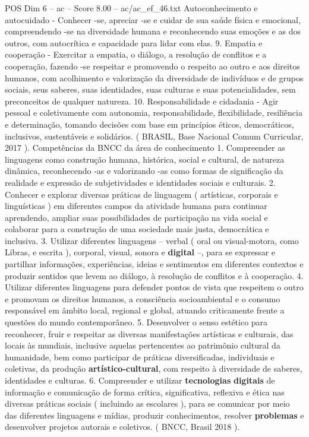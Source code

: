 \begin{textsample}{POS Dim 6 – ac – Score 8.00 – ac/ac\_ef\_46.txt}
Autoconhecimento e autocuidado - Conhecer -se, apreciar -se e cuidar de sua saúde física e emocional, compreendendo -se na diversidade humana e reconhecendo suas emoções e as dos outros, com autocrítica e capacidade para lidar com elas. 9.
Empatia e cooperação - Exercitar a empatia, o diálogo, a resolução de conflitos e a cooperação, fazendo -se respeitar e promovendo o respeito ao outro e aos direitos humanos, com acolhimento e valorização da diversidade de indivíduos e de grupos sociais, seus saberes, suas identidades, suas culturas e suas potencialidades, sem preconceitos de qualquer natureza. 10.
Responsabilidade e cidadania - Agir pessoal e coletivamente com autonomia, responsabilidade, flexibilidade, resiliência e determinação, tomando decisões com base em princípios éticos, democráticos, inclusivos, sustentáveis e solidários. ( BRASIL, Base Nacional Comum Curricular, 2017 ).
Competências da BNCC da área de conhecimento 1.
Compreender as linguagens como construção humana, histórica, social e cultural, de natureza dinâmica, reconhecendo -as e valorizando -as como formas de significação da realidade e expressão de subjetividades e identidades sociais e culturais. 2.
Conhecer e explorar diversas práticas de linguagem ( artísticas, corporais e linguísticas ) em diferentes campos da atividade humana para continuar aprendendo, ampliar suas possibilidades de participação na vida social e colaborar para a construção de uma sociedade mais justa, democrática e inclusiva. 3.
Utilizar diferentes linguagens – verbal ( oral ou visual-motora, como Libras, e escrita ), corporal, visual, sonora e \textbf{digital} –, para se expressar e partilhar informações, experiências, ideias e sentimentos em diferentes contextos e produzir sentidos que levem ao diálogo, à resolução de conflitos e à cooperação. 4.
Utilizar diferentes linguagens para defender pontos de vista que respeitem o outro e promovam os direitos humanos, a consciência socioambiental e o consumo responsável em âmbito local, regional e global, atuando criticamente frente a questões do mundo contemporâneo. 5.
Desenvolver o senso estético para reconhecer, fruir e respeitar as diversas manifestações artísticas e culturais, das locais às mundiais, inclusive aquelas pertencentes ao patrimônio cultural da humanidade, bem como participar de práticas diversificadas, individuais e coletivas, da produção \textbf{artístico-cultural}, com respeito à diversidade de saberes, identidades e culturas. 6.
Compreender e utilizar \textbf{tecnologias} \textbf{digitais} de informação e comunicação de forma crítica, significativa, reflexiva e ética nas diversas práticas sociais ( incluindo as escolares ), para se comunicar por meio das diferentes linguagens e mídias, produzir conhecimentos, resolver \textbf{problemas} e desenvolver projetos autorais e coletivos. ( BNCC, Brasil 2018 ).

\end{textsample}
